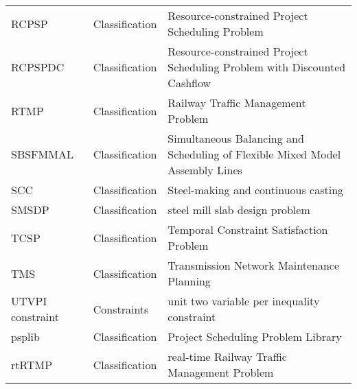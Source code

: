 {\begin{longtable}{llp{12cm}}
\index{RCPSP (Resource-constrained Project Scheduling Problem)}\index{Resource-constrained Project Scheduling Problem (RCPSP)}RCPSP & Classification & Resource-constrained Project Scheduling Problem\\
\index{RCPSPDC (Resource-constrained Project Scheduling Problem with Discounted Cashflow)}\index{Resource-constrained Project Scheduling Problem with Discounted Cashflow (RCPSPDC)}RCPSPDC & Classification & Resource-constrained Project Scheduling Problem with Discounted Cashflow\\
\index{RTMP (Railway Traffic Management Problem)}\index{Railway Traffic Management Problem (RTMP)}RTMP & Classification & Railway Traffic Management Problem\\
\index{SBSFMMAL (Simultaneous Balancing and Scheduling of Flexible Mixed Model Assembly Lines)}\index{Simultaneous Balancing and Scheduling of Flexible Mixed Model Assembly Lines (SBSFMMAL)}SBSFMMAL & Classification & Simultaneous Balancing and Scheduling of Flexible Mixed Model Assembly Lines\\
\index{SCC (Steel-making and continuous casting)}\index{Steel-making and continuous casting (SCC)}SCC & Classification & Steel-making and continuous casting\\
\index{SMSDP (steel mill slab design problem)}\index{steel mill slab design problem (SMSDP)}SMSDP & Classification & steel mill slab design problem\\
\index{TCSP (Temporal Constraint Satisfaction Problem)}\index{Temporal Constraint Satisfaction Problem (TCSP)}TCSP & Classification & Temporal Constraint Satisfaction Problem\\
\index{TMS (Transmission Network Maintenance Planning)}\index{Transmission Network Maintenance Planning (TMS)}TMS & Classification & Transmission Network Maintenance Planning\\
\index{UTVPI constraint (unit two variable per inequality constraint)}\index{unit two variable per inequality constraint (UTVPI constraint)}UTVPI constraint & Constraints & unit two variable per inequality constraint\\
\index{psplib (Project Scheduling Problem Library)}\index{Project Scheduling Problem Library (psplib)}psplib & Classification & Project Scheduling Problem Library\\
\index{rtRTMP (real-time Railway Traffic Management Problem)}\index{real-time Railway Traffic Management Problem (rtRTMP)}rtRTMP & Classification & real-time Railway Traffic Management Problem\\
\end{longtable}
}

